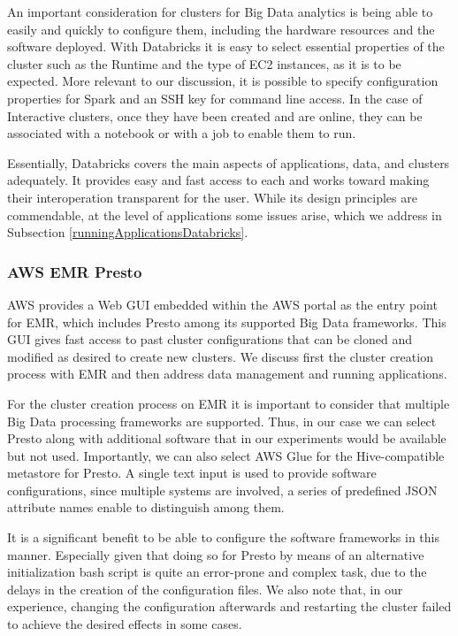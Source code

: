 An important consideration for clusters for Big Data analytics is being able to easily and quickly to configure them, including the hardware resources and the software deployed. With Databricks it is easy to select essential properties of the cluster such as the Runtime and the type of EC2 instances, as it is to be expected. More relevant to our discussion, it is possible to specify configuration properties for Spark and an SSH key for command line access. In the case of Interactive clusters, once they have been created and are online, they can be associated with a notebook or with a job to enable them to run.

Essentially, Databricks covers the main aspects of applications, data, and clusters adequately. It provides easy and fast access to each and works toward making their interoperation transparent for the user. While its design principles are commendable, at the level of applications some issues arise, which we address in Subsection \ref{runningApplicationsDatabricks}.

\subsubsection{AWS EMR Presto}
AWS provides a Web GUI embedded within the AWS portal as the entry point for EMR, which includes Presto among its supported Big Data frameworks. This GUI gives fast access to past cluster configurations that can be cloned and modified as desired to create new clusters. We discuss first the cluster creation process with EMR and then address data management and running applications.

For the cluster creation process on EMR it is important to consider that multiple Big Data processing frameworks are supported. Thus, in our case we can select Presto along with additional software that in our experiments would be available but not used. Importantly, we can also select AWS Glue for the Hive-compatible metastore for Presto. A single text input is used to provide software configurations, since multiple systems are involved, a series of predefined JSON attribute names enable to distinguish among them.

It is a significant benefit to be able to configure the software frameworks in this manner. Especially given that doing so for Presto by means of an alternative initialization bash script is quite an error-prone and complex task, due to the delays in the creation of the configuration files. We also note that, in our experience, changing the configuration afterwards and restarting the cluster failed to achieve the desired effects in some cases.

